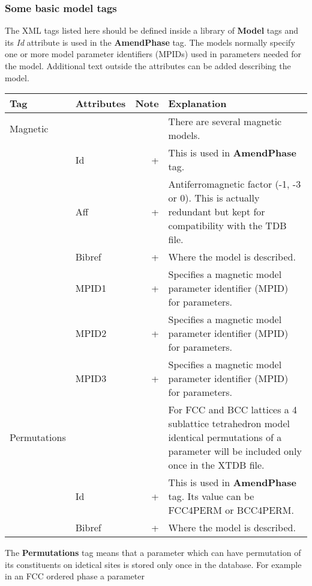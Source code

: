 \documentclass{article}
\begin{document}
\subsubsection{Some basic model tags}

The XML tags listed here should be defined inside a library of {\bf
  Model} tags and its {\em Id} attribute is used in the {\bf
  AmendPhase} tag.  The models normally specify one or more model
parameter identifiers (MPIDs) used in parameters needed for the model.
Additional text outside the attributes can be added describing the
model.

\bigskip
\begin{tabular}{|p{} p{} r p{}|}\hline
  Tag & Attributes & Note & Explanation\\\hline

  Magnetic & && There are several magnetic models.\\
      & Id & + & This is used in {\bf AmendPhase} tag.\\
      & Aff   & + & Antiferromagnetic factor (-1, -3 or 0).  This is actually
                    redundant but kept for compatibility with the TDB file.\\
      & Bibref & + & Where the model is described.\\
      & MPID1 & + & Specifies a magnetic model parameter 
                    identifier (MPID) for parameters.\\
      & MPID2 & + & Specifies a magnetic model parameter 
                    identifier (MPID) for parameters.\\
      & MPID3 & + & Specifies a magnetic model parameter 
                    identifier (MPID) for parameters.\\\hline


 Permutations & & & For FCC and BCC lattices a 4 sublattice tetrahedron model
                    identical permutations of a parameter will be included 
                    only once in the XTDB file.\\
     & Id & + & This is used in {\bf AmendPhase} tag.  Its value can be
                  FCC4PERM or BCC4PERM.\\
     & Bibref & + & Where the model is described.\\\hline

\end{tabular}

The {\bf Permutations} tag means that a parameter which can have
permutation of its constituents on idetical sites is stored only once
in the database.  For example in an FCC ordered phase a parameter
\end{document}

